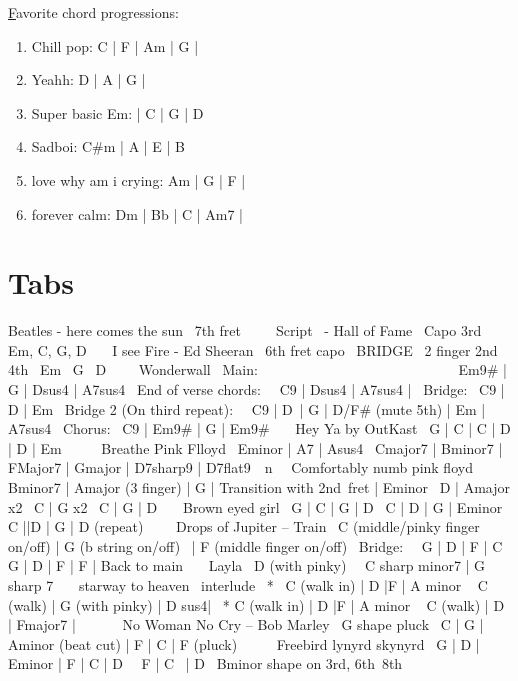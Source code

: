 \documentclass{article}
\begin{document}
\hyperlink{https://www.youtube.com/watch?v=Y2LhlJkQD2Q}
Favorite chord progressions: 
\begin{enumerate}
    \item Chill pop: C | F | Am | G |
    \item Yeahh: D | A | G |
    \item Super basic Em: | C | G | D
    \item Sadboi: C#m | A | E | B
    \item love why am i crying: Am | G | F |
    \item forever calm: Dm | Bb | C | Am7 |
\end{enumerate}



\section{Tabs}

Beatles - here comes the sun 
7th fret 
 
 
Script  - Hall of Fame 
Capo 3rd 
Em, C, G, D 
  
I see Fire - Ed Sheeran 
6th fret capo 
BRIDGE 
2 finger 2nd 4th \ Em \ G \ D  
  
Wonderwall 
Main:                            
Em9# | G | Dsus4 | A7sus4 
End of verse chords:  
C9 | Dsus4 | A7sus4 | 
Bridge: 
C9 | D | Em 
Bridge 2 (On third repeat):  
C9 | D | G | D/F# (mute 5th) | Em | A7sus4 
Chorus: 
C9 | Em9# | G | Em9# 
  
Hey Ya by OutKast 
G | C | C | D | D | Em 
  
  
Breathe Pink Flloyd 
Eminor | A7 | Asus4 
Cmajor7 | Bminor7 | FMajor7 | Gmajor | D7sharp9 | D7flat9 
 n  
Comfortably numb pink floyd 
Bminor7 | Amajor (3 finger) | G | Transition with 2nd fret | Eminor 
D | Amajor x2 
C | G x2 
C | G | D 
  
Brown eyed girl 
G | C | G | D 
C | D | G | Eminor 
C ||D | G | D (repeat)  
  
Drops of Jupiter – Train 
C (middle/pinky finger on/off) | G (b string on/off)  | F (middle finger on/off) 
Bridge:  
G | D | F | C 
G | D | F | F | Back to main 
  
Layla 
D (with pinky)  
C sharp minor7 | G sharp 7 
  
starway to heaven 
interlude 
*  C (walk in) | D |F | A minor  
C (walk) | G (with pinky) | D sus4| 
* C (walk in) | D |F | A minor  
C (walk) | D | Fmajor7 |  
  
  
No Woman No Cry – Bob Marley 
G shape pluck 
C | G | Aminor (beat cut) | F | C | F (pluck) 
  
  
Freebird lynyrd skynyrd 
G | D | Eminor | F | C | D  
F | C  | D 
Bminor shape on 3rd, 6th 8th      
\end{document}
